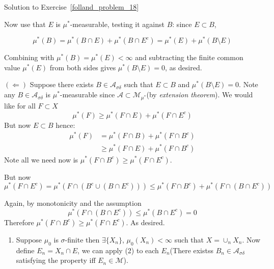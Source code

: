 \begin{mystsolution}{Solution to Exercise~\ref{folland_problem_18}}
\begin{enumerate}[resume]
Now use that $E$ is $\mu^*$-measurable, testing it against $B$: since $E\subset B$,

\begin{equation}
\mu^*(B) = \mu^*(B\cap E)+\mu^*(B\cap E^c) = \mu^*(E) + \mu^*(B\setminus E)
\end{equation}


Combining with $\mu^*(B)=\mu^*(E)<\infty$ and subtracting the finite common value $\mu^*(E)$ from both sides gives $\mu^*(B\setminus E)=0$, as desired.
\end{enumerate}

$(\Longleftarrow)$ Suppose there exists $B\in \mathcal A_{\sigma \delta}$ such that $E\subset B$ and $\mu^*(B\setminus E)=0$. Note any $B\in \mathcal A_{\sigma \delta}$ is $\mu^*$-measurable since $\mathcal A \subset \mathcal M_{\mu^*}$(by \textit{extension theorem}).
We would like for all $F\subset X$
\begin{equation}
\mu^*(F) \geq  \mu^*(F\cap E) +\mu^*(F \cap E^c)
\end{equation}
But now $E\subset B$ hence:
\begin{equation}
\begin{aligned}
\mu^*(F) &= \mu^*(F\cap B) + \mu^*(F\cap B^c) \\ 
&\geq  \mu^*(F\cap E) + \mu^*(F\cap B^c)
\end{aligned}
\end{equation}
Note all we need now is $\mu^*(F \cap B^c) \geq  \mu^*(F\cap E^c)$.

But now
\begin{equation}
\mu^*(F\cap E^c) = \mu^*(F\cap (B^c \cup (B\cap E^c))) \leq \mu^*(F\cap B^c)  + \mu^*(F\cap (B\cap E^c))
\end{equation}

Again, by monotonicity and the assumption
\begin{equation}
\mu^*(F\cap (B\cap E^c))\leq \mu^*(B\cap E^c) = 0
\end{equation}
Therefore
$\mu^*(F \cap B^c) \geq  \mu^*(F\cap E^c)$. As desired.

\begin{enumerate}[resume]
\item Suppose $\mu_0$ is $\sigma$-finite then $\exists \{X_n\}$, $\mu_0(X_n)<\infty$ such that $X = \cup_n X_n$. Now define $E_n= X_n\cap E$, we can apply (2) to each $E_n$(There existss $B_n\in \mathcal A_{\sigma\delta}$ satisfying the property iff $E_n\in \mathcal M$).
\end{enumerate}


\end{mystsolution}
